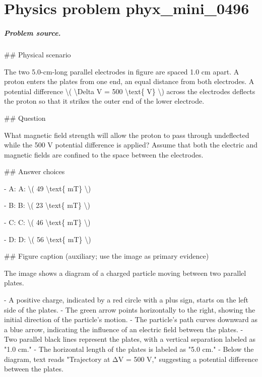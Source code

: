 
\chapter{Physics problem phyx\_mini\_0496}
\label{ch:PhyXMiniProblems_problem_phyx_mini_0496}

\paragraph{Problem source.}
\#\# Physical scenario

The two 5.0-cm-long parallel electrodes in figure are spaced 1.0 cm apart. A proton enters the plates from one end, an equal distance from both electrodes. A potential difference \textbackslash{}( \textbackslash{}Delta V = 500 \textbackslash{}text\{ V\} \textbackslash{}) across the electrodes deflects the proton so that it strikes the outer end of the lower electrode.

\#\# Question

What magnetic field strength will allow the proton to pass through undeflected while the 500 V potential difference is applied? Assume that both the electric and magnetic fields are confined to the space between the electrodes.

\#\# Answer choices

- A: A: \textbackslash{}( 49 \textbackslash{}text\{ mT\} \textbackslash{})

- B: B: \textbackslash{}( 23 \textbackslash{}text\{ mT\} \textbackslash{})

- C: C: \textbackslash{}( 46 \textbackslash{}text\{ mT\} \textbackslash{})

- D: D: \textbackslash{}( 56 \textbackslash{}text\{ mT\} \textbackslash{})

\#\# Figure caption (auxiliary; use the image as primary evidence)

The image shows a diagram of a charged particle moving between two parallel plates. 

- A positive charge, indicated by a red circle with a plus sign, starts on the left side of the plates.
- The green arrow points horizontally to the right, showing the initial direction of the particle's motion.
- The particle's path curves downward as a blue arrow, indicating the influence of an electric field between the plates.
- Two parallel black lines represent the plates, with a vertical separation labeled as "1.0 cm."
- The horizontal length of the plates is labeled as "5.0 cm."
- Below the diagram, text reads "Trajectory at ΔV = 500 V," suggesting a potential difference between the plates.

